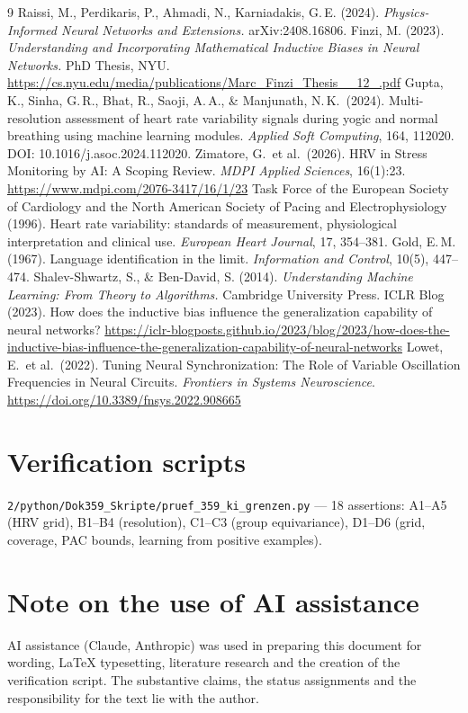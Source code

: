 \begin{thebibliography}{9}
  Raissi, M., Perdikaris, P., Ahmadi, N., Karniadakis, G.\,E. (2024).
  \emph{Physics-Informed Neural Networks and Extensions.}
  arXiv:2408.16806.
  Finzi, M. (2023).
  \emph{Understanding and Incorporating Mathematical Inductive Biases
  in Neural Networks.} PhD Thesis, NYU.
  \url{https://cs.nyu.edu/media/publications/Marc_Finzi_Thesis__12_.pdf}
  Gupta, K., Sinha, G.\,R., Bhat, R., Saoji, A.\,A., \& Manjunath, N.\,K.\ (2024).
  Multi-resolution assessment of heart rate variability signals during
  yogic and normal breathing using machine learning modules.
  \emph{Applied Soft Computing}, 164, 112020.
  DOI: 10.1016/j.asoc.2024.112020.
  Zimatore, G.\ et al.\ (2026).
  HRV in Stress Monitoring by AI: A Scoping Review.
  \emph{MDPI Applied Sciences}, 16(1):23.
  \url{https://www.mdpi.com/2076-3417/16/1/23}
  Task Force of the European Society of Cardiology and the North American
  Society of Pacing and Electrophysiology (1996).
  Heart rate variability: standards of measurement, physiological
  interpretation and clinical use.
  \emph{European Heart Journal}, 17, 354--381.
  Gold, E.\,M. (1967).
  Language identification in the limit.
  \emph{Information and Control}, 10(5), 447--474.
  Shalev-Shwartz, S., \& Ben-David, S. (2014).
  \emph{Understanding Machine Learning: From Theory to Algorithms.}
  Cambridge University Press.
  ICLR Blog (2023).
  How does the inductive bias influence the generalization capability
  of neural networks?
  \url{https://iclr-blogposts.github.io/2023/blog/2023/how-does-the-inductive-bias-influence-the-generalization-capability-of-neural-networks}
  Lowet, E.\ et al.\ (2022).
  Tuning Neural Synchronization: The Role of Variable Oscillation
  Frequencies in Neural Circuits.
  \emph{Frontiers in Systems Neuroscience}.
  \url{https://doi.org/10.3389/fnsys.2022.908665}
\end{thebibliography}

\section*{Verification scripts}

\texttt{2/python/Dok359\_Skripte/pruef\_359\_ki\_grenzen.py} ---
18 assertions: A1--A5 (HRV grid), B1--B4 (resolution), C1--C3
(group equivariance), D1--D6 (grid, coverage, PAC bounds, learning from
positive examples).

\section*{Note on the use of AI assistance}

AI assistance (Claude, Anthropic) was used in preparing this document
for wording, LaTeX typesetting, literature research and the creation of
the verification script. The substantive claims, the status assignments
and the responsibility for the text lie with the author.
